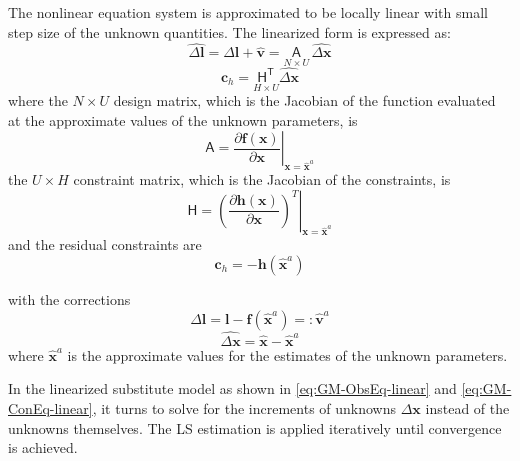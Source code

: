 \clearpage
The nonlinear equation system is approximated to be locally linear with small step size of the unknown quantities. The linearized form is expressed as:
\begin{equation} \label{eq:GM-ObsEq-linear}
\widehat{\Delta\boldsymbol l}=\Delta\boldsymbol l+\widehat{\boldsymbol v}=\underset{N\times U}{\mathsf{A}}\,\widehat{\Delta\boldsymbol x}
\end{equation}
\begin{equation} \label{eq:GM-ConEq-linear}
\boldsymbol c_h=\underset{H\times U}{\mathsf{H^T}}\widehat{\Delta\boldsymbol x}
\end{equation}
where\newline
the $N\times U$ design matrix, which is the Jacobian of the function evaluated at the approximate values of the unknown parameters, is
\begin{equation*}
\mathsf{A}=\left.\dfrac{\partial\boldsymbol f(\boldsymbol x)}{\partial\boldsymbol x}\right|_{\boldsymbol x=\widehat{\boldsymbol x}^a}
\end{equation*}
the $U\times H$ constraint matrix, which is the Jacobian of the constraints, is
\begin{equation*}
\mathsf{H}=\left.\left(\dfrac{\partial\boldsymbol h(\boldsymbol x)}{\partial\boldsymbol x}\right)^T\right|_{\boldsymbol x=\widehat{\boldsymbol x}^a}
\end{equation*}
and the residual constraints are %
\begin{equation*}
\boldsymbol c_h=-\boldsymbol h(\widehat{\boldsymbol x}^a)
\end{equation*}

with the corrections
\begin{equation} \label{eq:GM-ObsEq-linear-l}
\Delta\boldsymbol l=\boldsymbol l-\boldsymbol f(\widehat{\boldsymbol x}^a)=:\widehat{\boldsymbol v}^a
\end{equation}
\begin{equation} \label{eq:GM-ObsEq-linear-x}
\widehat{\Delta\boldsymbol x}=\widehat{\boldsymbol x}-\widehat{\boldsymbol x}^a
\end{equation}
where $\widehat{\boldsymbol x}^a$ is the approximate values for the estimates of the unknown parameters.

In the linearized substitute model as shown in \eqref{eq:GM-ObsEq-linear} and \eqref{eq:GM-ConEq-linear}, it turns to solve for the increments of unknowns $\Delta\boldsymbol x$ instead of the unknowns themselves. The LS estimation is applied iteratively until convergence is achieved. 

